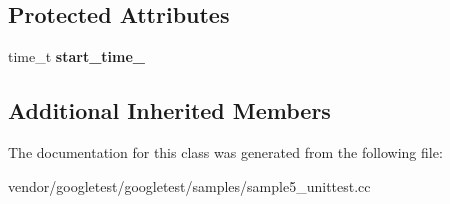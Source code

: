 \subsection*{Protected Attributes}
\begin{DoxyCompactItemize}
\item 
\mbox{\label{class_quick_test_aba6a28bbd733e72e3b088a0b66386809}} 
time\+\_\+t {\bfseries start\+\_\+time\+\_\+}
\end{DoxyCompactItemize}
\subsection*{Additional Inherited Members}


The documentation for this class was generated from the following file\+:\begin{DoxyCompactItemize}
\item 
vendor/googletest/googletest/samples/sample5\+\_\+unittest.\+cc\end{DoxyCompactItemize}
